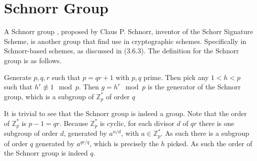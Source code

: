 \section{Schnorr Group} \label{SchnorrGroup}
A Schnorr group \cite{Schnorr}, proposed by Claus P. Schnorr, inventor of the Schorr Signature Scheme, is another group that find use in cryptographic schemes. Specifically in Schnorr-based schemes, as discussed in (3.6.3). The definition for the Schnorr group is as follows.
\begin{defn}
	Generate $p,q,r$ such that $p=qr+1$ with $p,q$ prime. Then pick any $1<h<p$ such that $h^r\not\equiv1\mod{p}$. Then $g=h^r\mod{p}$ is the generator of the Schnorr group, which is a subgroup of $\mathbb{Z}_{p}^*$ of order $q$
\end{defn}

\begin{prf}
	It is trivial to see that the Schnorr group is indeed a group. Note that the order of $\mathbb{Z}_{p}^*$ is $p-1=qr$. Because $\mathbb{Z}_{p}^*$ is cyclic, for each divisor $d$ of $qr$ there is one subgroup of order $d$, generated by $a^{n/d}$, with $a\in\mathbb{Z}_{p}^*$. As such there is a subgroup of order $q$ generated by $a^{qr/q}$, which is precisely the $h$ picked. As such the order of the Schnorr group is indeed $q$.
\end{prf}